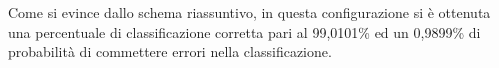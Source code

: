 Come si evince dallo schema riassuntivo, in questa configurazione si è ottenuta una percentuale di classificazione corretta pari al 99,0101\% ed un 0,9899\% di probabilità di commettere errori nella classificazione.